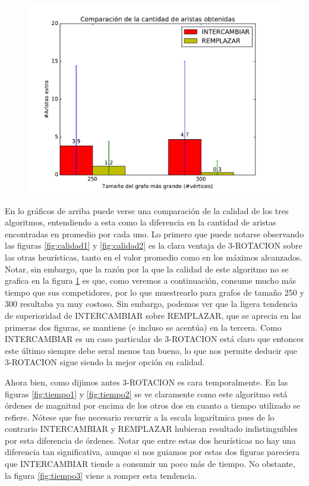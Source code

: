 \begin{figure}[H]
\begin{minipage}{0.49\textwidth}
  \centering
    \includegraphics[width=1\textwidth]{graficos/problema_5/calidad4.pdf}
  \caption{}
  \label{fig:calidad3}
\end{minipage}%
\end{figure}

En lo gráficos de arriba puede verse una comparación de la calidad de los tres algoritmos, entendiendo a esta como la diferencia en la cantidad de aristas encontradas en promedio por cada uno. Lo primero que puede notarse observando las figuras \ref{fig:calidad1} y \ref{fig:calidad2} es la clara ventaja de 3-ROTACION sobre las otras heurísticas, tanto en el valor promedio como en los máximos alcanzados. Notar, sin embargo, que la razón por la que la calidad de este algoritmo no se grafica en la figura \ref{fig:calidad3} es que, como veremos a continuación, consume mucho más tiempo que sus competidores, por lo que muestrearlo para grafos de tamaño 250 y 300 resultaba ya muy costoso. Sin embargo, podemos ver que la ligera tendencia de superioridad de INTERCAMBIAR sobre REMPLAZAR, que se aprecia  en las primeras dos figuras, se mantiene (e incluso se acentúa) en la tercera. Como INTERCAMBIAR es un caso particular de 3-ROTACION está claro que entonces este último siempre debe seral menos tan bueno, lo que nos permite deducir que 3-ROTACION sigue siendo la mejor opción en calidad.

Ahora bien, como dijimos antes 3-ROTACION es cara temporalmente. En las figuras \ref{fig:tiempo1} y \ref{fig:tiempo2} se ve claramente como este algoritmo está órdenes de magnitud por encima de los otros dos en cuanto a tiempo utilizado se refiere. Nótese que fue necesario recurrir a la escala logarítmica pues de lo contrario INTERCAMBIAR y REMPLAZAR hubieran resultado indistinguibles por esta diferencia de órdenes.  Notar que entre estas dos heurísticas no hay una diferencia tan significativa, aunque si nos guiamos por estas dos figuras pareciera que INTERCAMBIAR tiende a consumir un poco más de tiempo. No obstante, la figura \ref{fig:tiempo3} viene a romper esta tendencia. 

